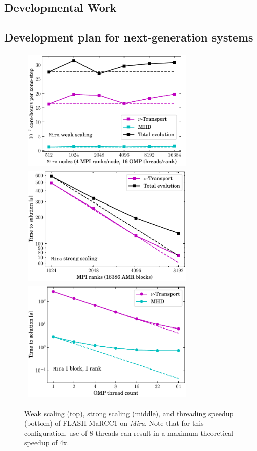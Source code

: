 \subsection{Developmental Work}

\subsection{Development plan for next-generation systems}


\begin{figure}
  \begin{tabular}{r}
    \includegraphics[width=3.25in]{figs/wkScaleSparkM1} \\
    \includegraphics[width=3.25in]{figs/strScaleSparkM1} \\
    \includegraphics[width=3.25in]{figs/thrdSpeedupSparkM1}
  \end{tabular}
  \caption{Weak scaling (top), strong scaling (middle), and threading
  speedup (bottom) of FLASH-MaRCC1 on {\it Mira}.  Note that for this configuration, use of 8 threads can result in a maximum theoretical speedup of 4x.}
  \label{fig:scaling}
\end{figure}
